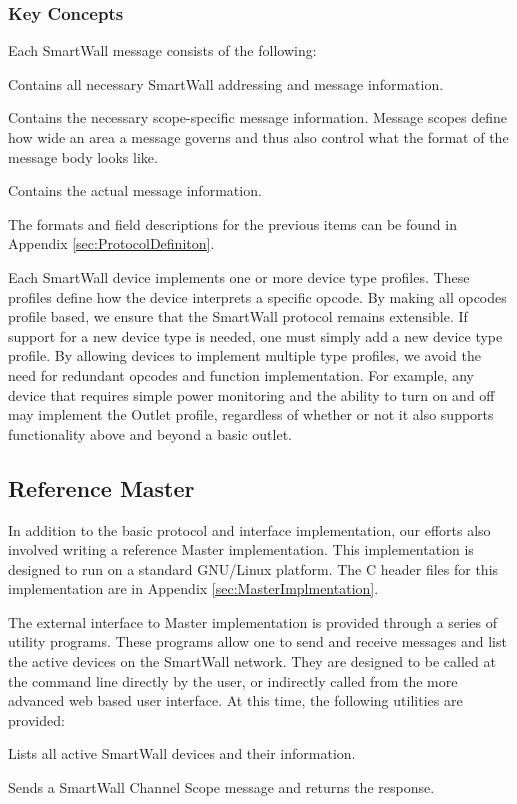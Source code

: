 \documentclass[11pt]{article}
\begin{document}
\subsubsection{Key Concepts}

Each SmartWall message consists of the following:
\begin{description}
  \setlength{\itemsep}{0pt}
  \setlength{\parskip}{0pt}
  \setlength{\parsep}{0pt}
\item[SmartWall Message Header:] Contains all necessary SmartWall
  addressing and message information.
\item[SmartWall Scope Header:] Contains the necessary scope-specific
  message information. Message scopes define how wide an area a
  message governs and thus also control what the format of the message
  body looks like.
\item[SmartWall Message Body:] Contains the actual message information.
\end{description}

The formats and field descriptions for the previous items can be found
in Appendix \ref{sec:ProtocolDefiniton}.

Each SmartWall device implements one or more device
type profiles. These profiles define how the device interprets a
specific opcode. By making all opcodes profile based, we ensure that
the SmartWall protocol remains extensible. If support for a new device
type is needed, one must simply add a new device type profile. By
allowing devices to implement multiple type profiles, we avoid the need
for redundant opcodes and function implementation. For example, any
device that requires simple power monitoring and the ability to turn
on and off may implement the Outlet profile, regardless of whether or not
it also supports functionality above and beyond a basic outlet.

\subsection{Reference Master}
\label{sec:Implementaion.ReferenceMaster}
In addition to the basic protocol and interface implementation, our
efforts also involved writing a reference Master implementation. This
implementation is designed to run on a standard GNU/Linux
platform. The C header files for this implementation are in Appendix
\ref{sec:MasterImplmentation}.

The external interface to Master implementation is provided through a
series of utility programs. These programs allow one to send and
receive messages and list the active devices on the SmartWall
network. They are designed to be called at the command line directly by
the user, or indirectly called from the more advanced web based user
interface. At this time, the following utilities are provided:
\begin{description}
  \setlength{\itemsep}{0pt}
  \setlength{\parskip}{0pt}
  \setlength{\parsep}{0pt}
\item[swls:] Lists all active SmartWall devices and their information.  
\item[swChnMsg:] Sends a SmartWall Channel Scope message and returns
  the response.
\end{description}
\end{document}
